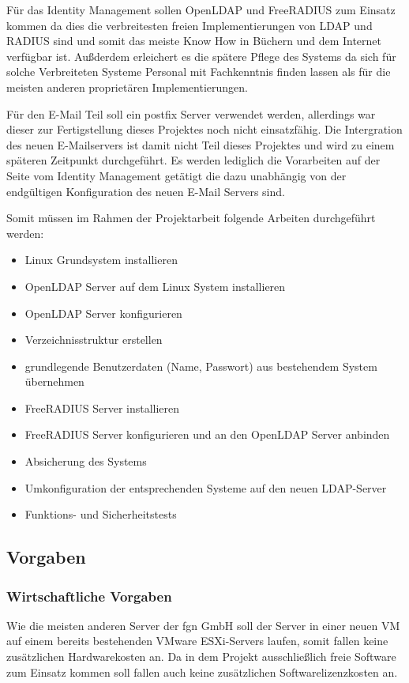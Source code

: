 \documentclass[11pt,a4paper,titlepage=firstiscover]{scrartcl} %
\begin{document}
F\"ur das Identity Management sollen OpenLDAP und FreeRADIUS zum Einsatz kommen da dies die verbreitesten freien Implementierungen von LDAP und RADIUS sind und somit das meiste Know How in B\"uchern und dem Internet verf\"ugbar ist. Au\ss{}derdem erleichert es die sp\"atere Pflege des Systems da sich f\"ur solche Verbreiteten Systeme Personal mit Fachkenntnis finden lassen als f\"ur die meisten anderen propriet\"aren Implementierungen.

F\"ur den E-Mail Teil soll ein postfix Server verwendet werden, allerdings war dieser zur Fertigstellung dieses Projektes noch nicht einsatzf\"ahig. Die Intergration des neuen E-Mailservers ist damit nicht Teil dieses Projektes und wird zu einem sp\"ateren Zeitpunkt durchgef\"uhrt. Es werden lediglich die Vorarbeiten auf der Seite vom Identity Management get\"atigt die dazu unabh\"angig von der endg\"ultigen Konfiguration des neuen E-Mail Servers sind.\newline

\noindent 		%
Somit m\"ussen im Rahmen der Projektarbeit folgende Arbeiten durchgef\"uhrt werden: 
\begin{itemize}
\item Linux Grundsystem installieren
\item OpenLDAP Server auf dem Linux System installieren
\item OpenLDAP Server konfigurieren
\item Verzeichnisstruktur erstellen
\item grundlegende Benutzerdaten (Name, Passwort) aus bestehendem System \"ubernehmen
\item FreeRADIUS Server installieren
\item FreeRADIUS Server konfigurieren und an den OpenLDAP Server anbinden
\item Absicherung des Systems
\item Umkonfiguration der entsprechenden Systeme auf den neuen LDAP-Server
\item Funktions- und Sicherheitstests
\end{itemize}


\subsection{Vorgaben}
\subsubsection{Wirtschaftliche Vorgaben}
Wie die meisten anderen Server der fgn GmbH soll der Server in einer neuen VM auf einem bereits bestehenden VMware ESXi-Servers laufen, somit fallen keine zus\"atzlichen Hardwarekosten an. Da in dem Projekt  ausschlie\ss{}lich freie Software zum Einsatz kommen soll fallen auch keine zus\"atzlichen Softwarelizenzkosten an.
\end{document}
